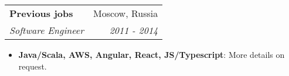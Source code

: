 \documentclass[letterpaper,10pt]{article}
\makeatletter
\newcommand{\resumeItem}[2]{
  \item\small{
    \textbf{#1}{: #2 \vspace{-2pt}}
  }
}
\newcommand{\resumeSubheading}[4]{
  \vspace{-1pt}\item
    \begin{tabular*}{0.97\textwidth}[t]{l@{\extracolsep{\fill}}r}
      \textbf{#1} & #2 \\
      \textit{\small#3} & \textit{\small #4} \\
    \end{tabular*}\vspace{-5pt}
}
\newcommand{\resumeSubSubheading}[2]{
    \begin{tabular*}{0.97\textwidth}{l@{\extracolsep{\fill}}r}
      \textit{\small#1} & \textit{\small #2} \\
    \end{tabular*}\vspace{-5pt}
}
\newcommand{\resumeSubHeadingListEnd}{\end{itemize}}
\newcommand{\resumeItemListStart}{\begin{itemize}}
\newcommand{\resumeItemListEnd}{\end{itemize}\vspace{-5pt}}
\makeatother
\begin{document}




    \resumeSubheading
      {Previous jobs}{Moscow, Russia}
      {Software Engineer}{2011 - 2014}
      \resumeItemListStart
        \resumeItem{Java/Scala, AWS, Angular, React, JS/Typescript}
          {More details on request.}
      \resumeItemListEnd






      
\end{document}
